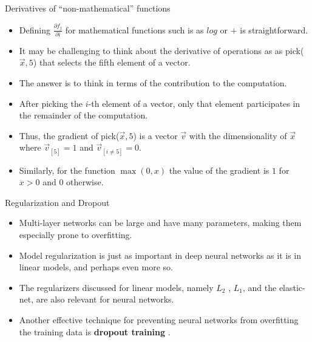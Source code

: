 \documentclass[handout]{beamer}
\begin{document}
\begin{frame}{Derivatives of ``non-mathematical'' functions}
\begin{scriptsize}
\begin{itemize}

\item Defining  $\frac{\partial f_j}{ \partial i}$ for mathematical functions such is as $log$ or $+$ is straightforward.

\item It may be challenging to think about the derivative of operations as as pick($\vec{x},5$) that selects the fifth element of a vector.

\item The answer is to think in terms of the contribution to the computation. 

\item After picking the $i$-th element of a vector, only that element participates in the remainder of the computation. 

\item Thus, the gradient of pick($\vec{x},5$) is a vector $\vec{v}$ with the dimensionality of $\vec{x}$ where $\vec{v}_{[5]} =1$ and $\vec{v}_{[i \neq 5]} = 0$.

\item Similarly, for the function $\max(0,x)$  the value of the gradient is $1$ for $x>0$ and $0$ otherwise.

\end{itemize}
\end{scriptsize}
\end{frame}




\begin{frame}{Regularization and Dropout}
\begin{scriptsize}
\begin{itemize}
\item Multi-layer networks can be large and have many parameters, making them especially prone to overfitting.

\item Model regularization is just as important in deep neural networks as it is in linear models, and perhaps even more so.

\item The regularizers discussed for linear models, namely $L_2$ , $L_1$, and the elastic-net, are also relevant for neural networks.

\item Another effective technique for preventing neural networks from overfitting the training data is \textbf{dropout training} \cite{hinton2012improving}.


\end{itemize}
\end{scriptsize}
\end{frame}
\end{document}
